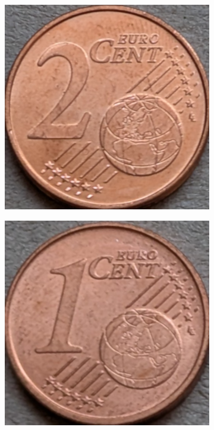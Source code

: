 \begin{figure}[ht]
\begin{subfigure}{0.23\textwidth}
    \end{subfigure}
    \begin{subfigure}{0.23\textwidth}
        \includegraphics[width=\linewidth]{../CoinFinder/templates_2/Cent2.png}
    \end{subfigure}
    \begin{subfigure}{0.23\textwidth}
        \includegraphics[width=\linewidth]{../CoinFinder/templates_2/Cent1.png}
    \end{subfigure}
\end{figure}

